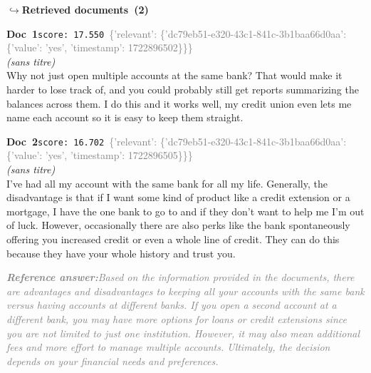 \documentclass[a4paper,11pt]{article}
\begin{document}
\noindent\hfill{\footnotesize\textcolor{doccolor}{\textbf{$\hookrightarrow$\enspace Retrieved documents~(2)}}}
\begin{docenv}
{\footnotesize\textcolor{doccolor}{\textbf{Doc~1}}}\hfill{\tiny\texttt{score:~17.550}}\ {\tiny\textcolor{gray}{\{'relevant': \{'dc79eb51-e320-43c1-841c-3b1baa66d0aa': \{'value': 'yes', 'timestamp': 1722896502\}\}\}}}\\[3pt]
{\small\textit{(sans titre)}}\\[2pt]
\vspace{2pt}
{\footnotesize 
Why not just open multiple accounts at the same bank? That would make it harder to lose track of, and you could probably still get reports summarizing the balances across them. I do this and it works well, my credit union even lets me name each account so it is easy to keep them straight.}
\end{docenv}
\begin{docenv}
{\footnotesize\textcolor{doccolor}{\textbf{Doc~2}}}\hfill{\tiny\texttt{score:~16.702}}\ {\tiny\textcolor{gray}{\{'relevant': \{'dc79eb51-e320-43c1-841c-3b1baa66d0aa': \{'value': 'yes', 'timestamp': 1722896505\}\}\}}}\\[3pt]
{\small\textit{(sans titre)}}\\[2pt]
\vspace{2pt}
{\footnotesize 
I've had all my account with the same bank for all my life. Generally, the disadvantage is that if I want some kind of product like a credit extension or a mortgage, I have the one bank to go to and if they don't want to help me I'm out of luck. However, occasionally there are also perks like the bank spontaneously offering you increased credit or even a whole line of credit. They can do this because they have your whole history and trust you.}
\end{docenv}
\begin{refanswerenv}
{\footnotesize\textit{\textcolor{gray}{\textbf{Reference answer:}\enspace Based on the information provided in the documents, there are advantages and disadvantages to keeping all your accounts with the same bank versus having accounts at different banks. If you open a second account at a different bank, you may have more options for loans or credit extensions since you are not limited to just one institution. However, it may also mean additional fees and more effort to manage multiple accounts. Ultimately, the decision depends on your financial needs and preferences.}}}
\end{refanswerenv}
\vspace{0.5em}
\end{document}
